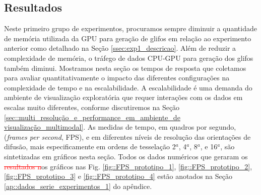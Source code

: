 
 
\subsection{Resultados}



Neste primeiro grupo de experimentos, procuramos sempre diminuir a quantidade de memória utilizada da GPU para geração de glifos em relação ao experimento anterior como detalhado na Seção \ref{ssec:exp1_descricao}. Além de reduzir a complexidade de memória, o tráfego de dados CPU-GPU para geração dos glifos também diminui. Mostramos nesta seção os tempos de resposta que coletamos para avaliar quantitativamente o impacto das diferentes configurações na complexidade de tempo e na escalabilidade. A escalabilidade é uma demanda do ambiente de visualização exploratória que requer interações com os dados em escalas muito diferentes, conforme discutiremos na Seção \ref{sec::multi_resolução_e_performance_em_ambiente_de visualização_multimodal}. As medidas de tempo, em quadros por segundo, (\textit{frames per second}, FPS), e em diferentes níveis de resolução das orientações de difusão, mais especificamente em ordens de tesselação 2$^a$, 4$^a$, 8$^a$, e 16$^a$, são sintetizadas em gráficos nesta seção.
Todos os dados numéricos que geraram os \textcolor{red}{\sout{resultados n}}os gráficos nas Fig. \ref{fig::FPS_prototipo_1}, \ref{fig::FPS_prototipo_2}, \ref{fig::FPS_prototipo_3} e \ref{fig::FPS_prototipo_4} estão anotados na Seção \ref{ap::dados_serie_experimentos_1} do apêndice.

